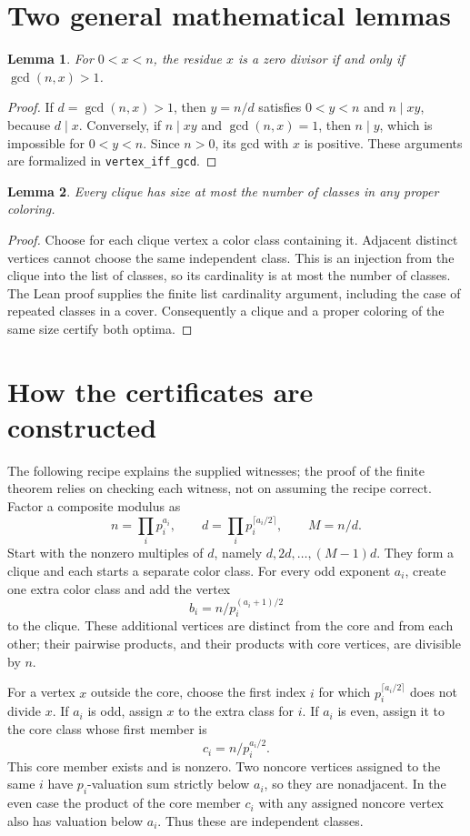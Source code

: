 \documentclass[10pt]{article}
\newtheorem{lemma}{Lemma}
\begin{document}
\section{Two general mathematical lemmas}
\begin{lemma}
For $0<x<n$, the residue $x$ is a zero divisor if and only if $\gcd(n,x)>1$.
\end{lemma}
\begin{proof}
If $d=\gcd(n,x)>1$, then $y=n/d$ satisfies $0<y<n$ and $n\mid xy$, because $d\mid x$. Conversely, if $n\mid xy$ and $\gcd(n,x)=1$, then $n\mid y$, which is impossible for $0<y<n$. Since $n>0$, its gcd with $x$ is positive. These arguments are formalized in \texttt{vertex\_iff\_gcd}.
\end{proof}
\begin{lemma}
Every clique has size at most the number of classes in any proper coloring.
\end{lemma}
\begin{proof}
Choose for each clique vertex a color class containing it. Adjacent distinct vertices cannot choose the same independent class. This is an injection from the clique into the list of classes, so its cardinality is at most the number of classes. The Lean proof supplies the finite list cardinality argument, including the case of repeated classes in a cover. Consequently a clique and a proper coloring of the same size certify both optima.
\end{proof}
\section{How the certificates are constructed}
The following recipe explains the supplied witnesses; the proof of the finite theorem relies on checking each witness, not on assuming the recipe correct. Factor a composite modulus as
\[
 n=\prod_i p_i^{a_i},\qquad
 d=\prod_i p_i^{\lceil a_i/2\rceil},\qquad M=n/d.
\]
Start with the nonzero multiples of $d$, namely $d,2d,\ldots,(M-1)d$. They form a clique and each starts a separate color class. For every odd exponent $a_i$, create one extra color class and add the vertex
\[
 b_i=n/p_i^{(a_i+1)/2}
\]
to the clique. These additional vertices are distinct from the core and from each other; their pairwise products, and their products with core vertices, are divisible by $n$.

For a vertex $x$ outside the core, choose the first index $i$ for which $p_i^{\lceil a_i/2\rceil}$ does not divide $x$. If $a_i$ is odd, assign $x$ to the extra class for $i$. If $a_i$ is even, assign it to the core class whose first member is
\[
 c_i=n/p_i^{a_i/2}.
\]
This core member exists and is nonzero. Two noncore vertices assigned to the same $i$ have $p_i$-valuation sum strictly below $a_i$, so they are nonadjacent. In the even case the product of the core member $c_i$ with any assigned noncore vertex also has valuation below $a_i$. Thus these are independent classes.
\end{document}
